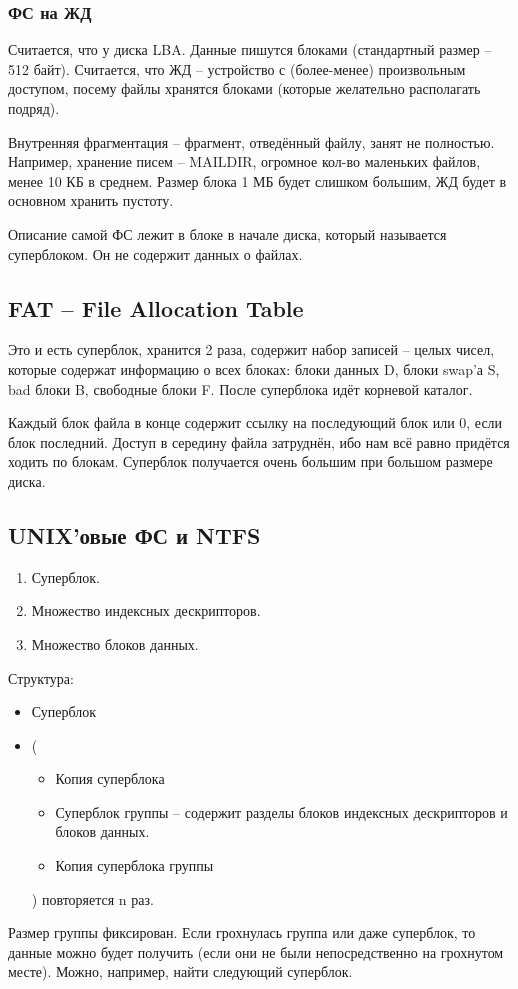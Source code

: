 \documentclass[a4paper,10pt]{article}
\begin{document}
\subsubsection{ФС на ЖД}
Считается, что у диска LBA. Данные пишутся блоками (стандартный размер -- 512 байт). Считается, что ЖД -- устройство с (более-менее) произвольным доступом, посему файлы хранятся блоками (которые желательно располагать подряд).

Внутренняя фрагментация -- фрагмент, отведённый файлу, занят не полностью. 
Например, хранение писем -- MAILDIR, огромное кол-во маленьких файлов, менее 10 КБ в среднем. Размер блока 1 МБ будет слишком большим, ЖД будет в основном хранить пустоту.

Описание самой ФС лежит в блоке в начале диска, который называется суперблоком. Он не содержит данных о файлах.

\subsection{FAT -- File Allocation Table}
Это и есть суперблок, хранится 2 раза, содержит набор записей -- целых чисел, которые содержат информацию о всех блоках: блоки данных D, блоки swap'а S, bad блоки B, свободные блоки F.
После суперблока идёт корневой каталог.

Каждый блок файла в конце содержит ссылку на последующий блок или 0, если блок последний. Доступ в середину файла затруднён, ибо нам всё равно придётся ходить по блокам. Суперблок получается очень большим при большом размере диска.

\subsection{UNIX'овые ФС и NTFS}
\begin{enumerate}
 \item Суперблок.
 \item Множество индексных дескрипторов.
 \item Множество блоков данных.
\end{enumerate}
Структура:
\begin{itemize}
 \item Суперблок
 \item (
 \begin{itemize}
  \item Копия суперблока
  \item Суперблок группы -- содержит разделы блоков индексных дескрипторов и блоков данных.
  \item Копия суперблока группы
 \end{itemize}
) повторяется n раз.
\end{itemize}
Размер группы фиксирован. Если грохнулась группа или даже суперблок, то данные можно будет получить (если они не были непосредственно на грохнутом месте). Можно, например, найти следующий суперблок.
\end{document}
